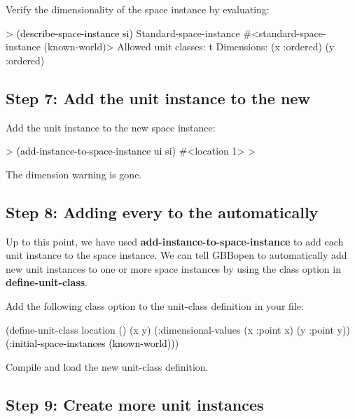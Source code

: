 \documentclass[10pt,twoside,english,pdftex]{article}
\begin{document}
%
Verify the dimensionality of the  space instance by evaluating:
%
\begin{example}\color{darkergray}%
  > \textcolor{black}{(describe-space-instance si)}
  Standard-space-instance #<standard-space-instance (known-world)>
    Allowed unit classes: t
    Dimensions:
      (x :ordered)
      (y :ordered)
\end{example}

\subsection*{Step 7: Add the  unit instance to the new
  }

%
Add the  unit instance to the new  space instance:
%
\begin{example}\color{darkergray}%
  > \textcolor{black}{(add-instance-to-space-instance ui si)}
  #<location 1>
  >
\end{example}

The dimension warning is gone.

\subsection*{Step 8: Adding every  to the 
  automatically}

Up to this point, we have used \textbf{add-instance-to-space-instance} to add
each  unit instance to the  space instance.
We can tell GBBopen to automatically add new unit instances to one or more
space instances by using the  class option in
\textbf{define-unit-class}.

%
Add the following  class option to the
 unit-class definition in your 
file:
%
\begin{example}\color{darkergray}%
  (define-unit-class location ()
    (x y)
    (:dimensional-values
      (x :point x)
      (y :point y))
    \textcolor{black}{(:initial-space-instances (known-world))})
\end{example}

Compile and load the new  unit-class definition.

\subsection*{Step 9: Create more  unit instances}
\end{document}

